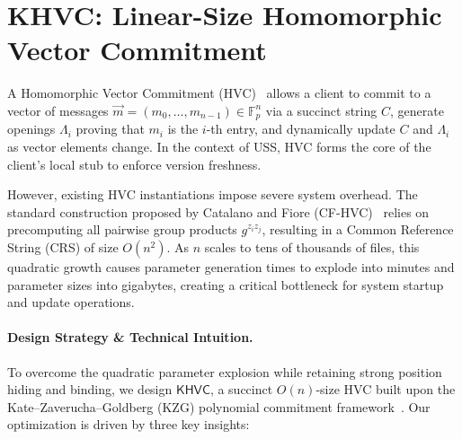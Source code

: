 \section{KHVC: Linear-Size Homomorphic Vector Commitment}
\label{sec:khvc}

A Homomorphic Vector Commitment (HVC)~\cite{CGLT23} allows a client to commit to a vector of messages $\vec{m} = (m_0, \dots, m_{n-1}) \in \mathbb{F}_p^n$ via a succinct string $C$, generate openings $\Lambda_i$ proving that $m_i$ is the $i$-th entry, and dynamically update $C$ and $\Lambda_i$ as vector elements change. In the context of USS, HVC forms the core of the client's local stub to enforce version freshness. 

However, existing HVC instantiations impose severe system overhead. The standard construction proposed by Catalano and Fiore (CF-HVC)~\cite{CF13} relies on precomputing all pairwise group products $g^{z_i z_j}$, resulting in a Common Reference String (CRS) of size $O(n^2)$. As $n$ scales to tens of thousands of files, this quadratic growth causes parameter generation times to explode into minutes and parameter sizes into gigabytes, creating a critical bottleneck for system startup and update operations.

\paragraph{Design Strategy \& Technical Intuition.}
To overcome the quadratic parameter explosion while retaining strong position hiding and binding, we design $\mathsf{KHVC}$, a succinct $O(n)$-size HVC built upon the Kate--Zaverucha--Goldberg (KZG) polynomial commitment framework~\cite{KZG10}. Our optimization is driven by three key insights:

